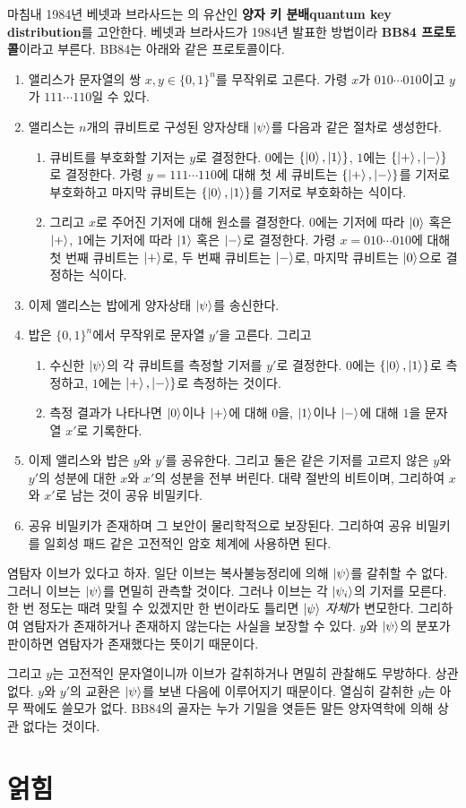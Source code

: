 \documentclass[a4paper,chapter,atbegshi]{oblivoir}
\begin{document}
마침내 1984년 베넷과 브라사드는 의 유산인 \textbf{양자 키
분배\tiny quantum key distribution}를 고안한다. 베넷과 브라사드가 1984년
발표한 방법이라 \textbf{BB84 프로토콜}이라고 부른다. BB84는 아래와 같은 
프로토콜이다.
\begin{mdframed}
\begin{enumerate}[label=(\Alph*)]
  \item 앨리스가 문자열의 쌍 $x,y\in\{0,1\}^n$를 무작위로 고른다. 가령 $x$가
    $010\cdots010$이고 $y$가 $111\cdots110$일 수 있다.
  \item 앨리스는 $n$개의 큐비트로 구성된 양자상태 $\ket{\psi}$를 다음과
    같은 절차로 생성한다. 
    \begin{enumerate}[label=(\roman*)]
      \item 큐비트를 부호화할 기저는 $y$로 결정한다. 
    $0$에는 $\{\ket0,\ket1\}$, $1$에는 $\{\ket+,\ket-\}$로 결정한다.
    가령 $y=111\cdots110$에 대해 첫 세 큐비트는 $\{\ket+,
    \ket-\}$를 기저로 부호화하고 마지막 큐비트는 $\{\ket0,\ket1\}$를 기저로 
    부호화하는 식이다. 
      \item 그리고 $x$로 주어진 기저에 대해 원소를 결정한다.
    $0$에는 기저에 따라 $\ket0$ 혹은 $\ket+$, $1$에는 기저에 따라 $\ket1$ 혹은
    $\ket-$로 결정한다. 가령 $x=010\cdots010$에 대해 첫 번째 큐비트는 $\ket+$로,
    두 번째 큐비트는 $\ket-$로, 마지막 큐비트는 $\ket0$으로 결정하는 식이다.
  \end{enumerate}
  \item 이제 앨리스는 밥에게 양자상태 $\ket{\psi}$를 송신한다. 
  \item 밥은 $\{0,1\}^n$에서 무작위로 문자열 $y'$을 고른다. 그리고 
    \begin{enumerate}[label=(\roman*)] 
      \item 수신한 $\ket{\psi}$의 각 큐비트를 측정할 기저를
  $y'$로 결정한다. $0$에는 $\{\ket0,\ket1\}$로 측정하고, $1$에는 $\ket+,\ket-\}$로
  측정하는 것이다. 
    \item 측정 결과가 나타나면 $\ket0$이나 $\ket+$에
    대해 $0$을, $\ket1$이나 $\ket-$에 대해 $1$을 문자열 $x'$로 기록한다.
  \end{enumerate}
  \item 이제 앨리스와 밥은 $y$와 $y'$를 공유한다. 그리고 둘은 같은 기저를
    고르지 않은 $y$와 $y'$의 성분에 대한 $x$와 $x'$의 성분을 전부 버린다.
    대략 절반의 비트이며, 그리하여  $x$와 $x'$로 남는 것이 공유 비밀키다.
  \item 공유 비밀키가 존재하며 그 보안이 물리학적으로 보장된다. 그리하여 
    공유 비밀키를 일회성 패드 같은 고전적인 암호 체계에 사용하면 된다.
\end{enumerate}
\end{mdframed}
염탐자 이브가 있다고 하자. 일단 이브는 복사불능정리에 의해 $\ket{\psi}$를
갈취할 수 없다. 그러니 이브는 $\ket{\psi}$를 면밀히 관측할
것이다. 그러나 이브는 각 $\ket{\psi_i}$의 기저를 모른다. 한 번
정도는 때려 맞힐 수 있겠지만 한 번이라도 틀리면 $\ket{\psi}$ \emph{자체}가
변모한다. 그리하여 염탐자가 존재하거나 존재하지 않는다는 사실을 보장할
수 있다. $y$와 $\ket{\psi}$의 분포가 판이하면 염탐자가 존재했다는 뜻이기 때문이다.

그리고 $y$는 고전적인 문자열이니까 이브가 갈취하거나 면밀히 관찰해도 무방하다.
상관 없다. $y$와 $y'$의 교환은 $\ket{\psi}$를 보낸 다음에 이루어지기
때문이다. 열심히 갈취한 $y$는 아무 짝에도 쓸모가 없다. BB84의 골자는
누가 기밀을 엿듣든 말든 양자역학에 의해 상관 없다는 것이다.
\chapter{얽힘}
\end{document}
